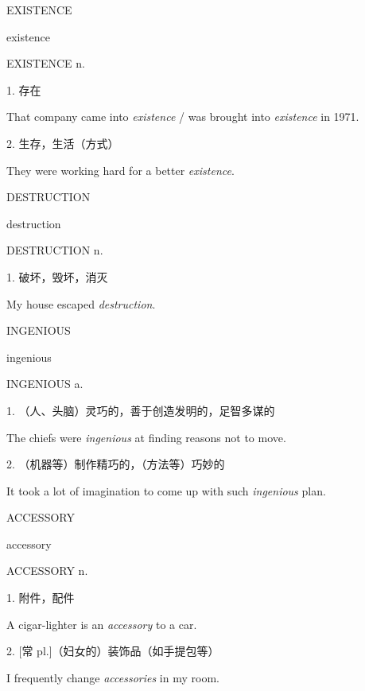\begin{flashcard}{
EXISTENCE

existence
}
\begin{center}
EXISTENCE n. 
\end{center}
1. 存在

That company came into \textit{existence} / was brought into \textit{existence} in 1971.

2. 生存，生活（方式）

They were working hard for a better \textit{existence}.

\end{flashcard}
\begin{flashcard}{
DESTRUCTION

destruction
}
\begin{center}
DESTRUCTION n. 
\end{center}
1. 破坏，毁坏，消灭

My house escaped \textit{destruction}.

\end{flashcard}
\begin{flashcard}{
INGENIOUS

ingenious
}
\begin{center}
INGENIOUS a. 
\end{center}
1. （人、头脑）灵巧的，善于创造发明的，足智多谋的

The chiefs were \textit{ingenious} at finding reasons not to move.

2. （机器等）制作精巧的，（方法等）巧妙的

It took a lot of imagination to come up with such \textit{ingenious} plan.

\end{flashcard}
\begin{flashcard}{
ACCESSORY

accessory
}
\begin{center}
ACCESSORY n. 
\end{center}
1. 附件，配件

A cigar-lighter is an \textit{accessory} to a car.

2. [常 pl.]（妇女的）装饰品（如手提包等）

I frequently change \textit{accessories} in my room.

\end{flashcard}
